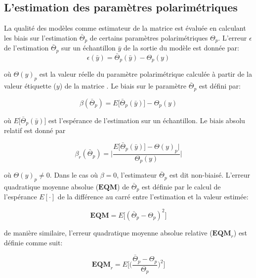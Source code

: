 \subsection{L'estimation des paramètres polarimétriques}

La qualité des modèles comme estimateur de la matrice \matcoh est évaluée en calculant les biais sur l'estimation $\bar{\Theta}_p$ de certains paramètres polarimétriques $\Theta_p$. L'erreur $\epsilon$ de l'estimation $\bar{\Theta}_p$ sur un échantillon  $\bar{y}$ de la sortie du modèle est donnée par:
\begin{equation}
    \epsilon(\bar{y}) = \bar{\Theta}_p(\bar{y}) - \Theta_p (y)
\end{equation}

où $\Theta(y)_p$ est la valeur réelle du paramètre polarimétrique calculée à partir de la valeur étiquette ($y$) de la matrice \matcoh. Le biais sur le paramètre $\bar{\Theta}_p$ est défini par:

\begin{equation}
    \beta (\bar{\Theta}_p) = E\big[\bar{\Theta}_p(\bar{y})\big] - \Theta_p (y)
    \label{eq:bias}
\end{equation}

où $ E\big[\bar{\Theta}_p(\bar{y})\big]$ est l'espérance de l'estimation sur un échantillon. Le biais absolu relatif est donné par

\begin{equation}
     \beta_r (\bar{\Theta}_p) =\Bigg| \frac{E\big[\bar{\Theta}_p(\bar{y})\big] - \Theta(y)_p|}{\Theta_p(y)}\Bigg|
\end{equation}

où $\Theta(y)_p \neq 0$.  Dans le cas où $\beta = 0$, l'estimateur $\bar{\Theta}_p$ est dit non-biaisé. L'erreur quadratique moyenne absolue ($\textbf{EQM}$) de $\bar{\Theta}_p$ est définie par le calcul de l'espérance $E[ \cdot ]$ de la différence au carré entre l'estimation et la valeur estimée:

\begin{equation}
    \textbf{EQM} = E\big[(\bar{\Theta}_p - \Theta_p)^2\big]
    \label{eq:eqm}
\end{equation}

\vspace{5pt}

de manière similaire, l'erreur quadratique moyenne absolue relative ($\textbf{EQM}_r$) est définie comme suit:

\begin{equation}
    \textbf{EQM}_r = E\Bigg[\Bigg(\frac{\bar{\Theta}_p - \Theta_p}{ \Theta_p}\Bigg)^2\Bigg]
\end{equation}

